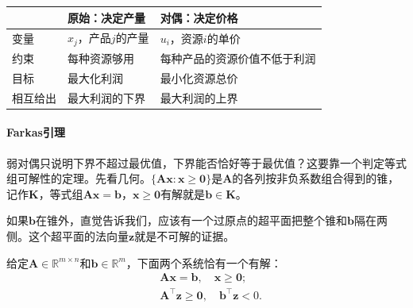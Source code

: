 \begin{BookInlineTable}
 \centering
 \begin{tabular}{lll}
  \toprule
  & 原始：决定产量 & 对偶：决定价格 \\
  \midrule
  变量 & $x_j$，产品$j$的产量 & $u_i$，资源$i$的单价 \\
  约束 & 每种资源够用 & 每种产品的资源价值不低于利润 \\
  目标 & 最大化利润 & 最小化资源总价 \\
  相互给出 & 最大利润的下界 & 最大利润的上界 \\
  \bottomrule
 \end{tabular}
 \caption{车间问题的原始问题与对偶问题。原始的一条约束对应对偶的一个变量，原始的一个变量对应对偶的一条约束。}
 \label{tab:lp-primal-dual}
\end{BookInlineTable}

\paragraph{Farkas引理}
弱对偶只说明下界不超过最优值，下界能否恰好等于最优值？这要靠一个判定等式组可解性的定理。先看几何。$\{\bm{A}\bm{x}:\bm{x}\geq\bm{0}\}$是$\bm{A}$的各列按非负系数组合得到的锥，记作$\bm{K}$，等式组$\bm{A}\bm{x}=\bm{b}$，$\bm{x}\geq\bm{0}$有解就是$\bm{b}\in\bm{K}$。

如果$\bm{b}$在锥外，直觉告诉我们，应该有一个过原点的超平面把整个锥和$\bm{b}$隔在两侧。这个超平面的法向量$\bm{z}$就是不可解的证据。

\begin{theorem}[Farkas引理]
 \label{thm:lp-farkas}
 给定$\bm{A}\in\mathbb{R}^{m\times n}$和$\bm{b}\in\mathbb{R}^m$，下面两个系统恰有一个有解：
 \begin{align}
  &\bm{A}\bm{x}=\bm{b},\quad\bm{x}\geq\bm{0}; \label{eq:lp-farkas-primal}\\
  &\bm{A}^\top\bm{z}\geq\bm{0},\quad\bm{b}^\top\bm{z}<0. \label{eq:lp-farkas-dual}
 \end{align}
\end{theorem}

